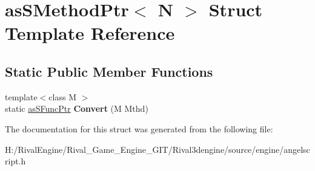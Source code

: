 \hypertarget{structas_s_method_ptr}{}\section{as\+S\+Method\+Ptr$<$ N $>$ Struct Template Reference}
\label{structas_s_method_ptr}
\subsection*{Static Public Member Functions}
\begin{DoxyCompactItemize}
\item 
\mbox{\label{structas_s_method_ptr_aab96c12cfc961048856147d0ec3b7fd9}} 
{\footnotesize template$<$class M $>$ }\\static \hyperlink{structas_s_func_ptr}{as\+S\+Func\+Ptr} {\bfseries Convert} (M Mthd)
\end{DoxyCompactItemize}


The documentation for this struct was generated from the following file\+:\begin{DoxyCompactItemize}
\item 
H\+:/\+Rival\+Engine/\+Rival\+\_\+\+Game\+\_\+\+Engine\+\_\+\+G\+I\+T/\+Rival3dengine/source/engine/angelscript.\+h\end{DoxyCompactItemize}
